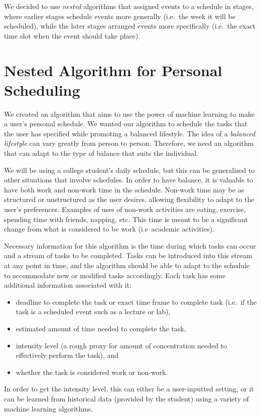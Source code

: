 \documentclass{article}
\begin{document}
	We decided to use \emph{nested} algorithms that assigned events to a schedule in stages, where earlier stages schedule events more generally (i.e.~the week it will be scheduled), while the later stages arranged events more specifically (i.e.~the exact time slot when the event should take place).

\section{Nested Algorithm for Personal Scheduling}
	We created an algorithm that aims to use the power of machine learning to make a user's personal schedule.
	We wanted our algorithm to schedule the tasks that the user has specified while promoting a balanced lifestyle.
	The idea of a \emph{balanced lifestyle} can vary greatly from person to person.
	Therefore, we need an algorithm that can adapt to the type of balance that suits the individual.

	We will be using a college student's daily schedule, but this can be generalized to other situations that involve schedules.
	In order to have balance, it is valuable to have both work and non-work time in the schedule.
	Non-work time may be as structured or unstructured as the user desires, allowing flexibility to adapt to the user's preferences.
	Examples of uses of non-work activities are eating, exercise, spending time with friends, napping, etc.
	This time is meant to be a significant change from what is considered to be work (i.e~academic activities).

	Necessary information for this algorithm is the time during which tasks can occur and a stream of tasks to be completed.
	Tasks can be introduced into this stream at any point in time, and the algorithm should be able to adapt to the schedule to accommodate new or modified tasks accordingly.
	Each task has some additional information associated with it:
	\begin{itemize}
		\item deadline to complete the task or exact time frame to complete task (i.e.~if the task is a scheduled event such as a lecture or lab),
		\item estimated amount of time needed to complete the task,
		\item intensity level (a rough proxy for amount of concentration needed to effectively perform the task), and
		\item whether the task is considered work or non-work.
	\end{itemize}
	In order to get the intensity level, this can either be a user-inputted setting, or it can be learned from historical data (provided by the student) using a variety of machine learning algorithms.
\end{document}

